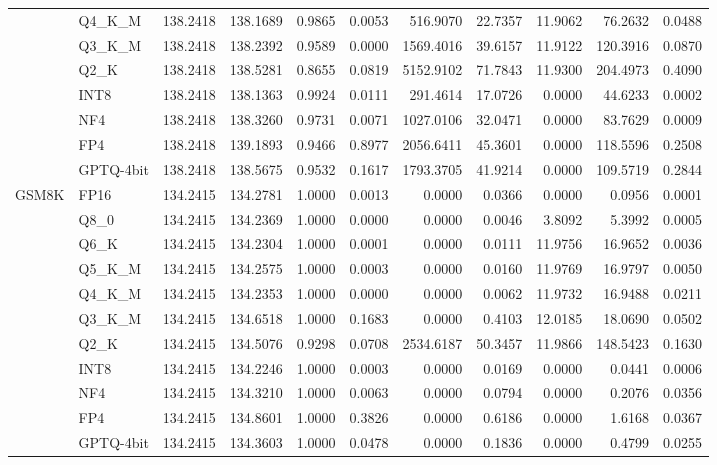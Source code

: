 \begin{table}[t]
{\begin{tabular}{llrrrrrrrrr}
 & Q4\_K\_M & 138.2418 & 138.1689 & 0.9865 & 0.0053 & 516.9070 & 22.7357 & 11.9062 & 76.2632 & 0.0488 \\
 & Q3\_K\_M & 138.2418 & 138.2392 & 0.9589 & 0.0000 & 1569.4016 & 39.6157 & 11.9122 & 120.3916 & 0.0870 \\
 & Q2\_K & 138.2418 & 138.5281 & 0.8655 & 0.0819 & 5152.9102 & 71.7843 & 11.9300 & 204.4973 & 0.4090 \\
 & INT8 & 138.2418 & 138.1363 & 0.9924 & 0.0111 & 291.4614 & 17.0726 & 0.0000 & 44.6233 & 0.0002 \\
 & NF4 & 138.2418 & 138.3260 & 0.9731 & 0.0071 & 1027.0106 & 32.0471 & 0.0000 & 83.7629 & 0.0009 \\
 & FP4 & 138.2418 & 139.1893 & 0.9466 & 0.8977 & 2056.6411 & 45.3601 & 0.0000 & 118.5596 & 0.2508 \\
 & GPTQ-4bit & 138.2418 & 138.5675 & 0.9532 & 0.1617 & 1793.3705 & 41.9214 & 0.0000 & 109.5719 & 0.2844 \\
\midrule
GSM8K & FP16 & 134.2415 & 134.2781 & 1.0000 & 0.0013 & 0.0000 & 0.0366 & 0.0000 & 0.0956 & 0.0001 \\
 & Q8\_0 & 134.2415 & 134.2369 & 1.0000 & 0.0000 & 0.0000 & 0.0046 & 3.8092 & 5.3992 & 0.0005 \\
 & Q6\_K & 134.2415 & 134.2304 & 1.0000 & 0.0001 & 0.0000 & 0.0111 & 11.9756 & 16.9652 & 0.0036 \\
 & Q5\_K\_M & 134.2415 & 134.2575 & 1.0000 & 0.0003 & 0.0000 & 0.0160 & 11.9769 & 16.9797 & 0.0050 \\
 & Q4\_K\_M & 134.2415 & 134.2353 & 1.0000 & 0.0000 & 0.0000 & 0.0062 & 11.9732 & 16.9488 & 0.0211 \\
 & Q3\_K\_M & 134.2415 & 134.6518 & 1.0000 & 0.1683 & 0.0000 & 0.4103 & 12.0185 & 18.0690 & 0.0502 \\
 & Q2\_K & 134.2415 & 134.5076 & 0.9298 & 0.0708 & 2534.6187 & 50.3457 & 11.9866 & 148.5423 & 0.1630 \\
 & INT8 & 134.2415 & 134.2246 & 1.0000 & 0.0003 & 0.0000 & 0.0169 & 0.0000 & 0.0441 & 0.0006 \\
 & NF4 & 134.2415 & 134.3210 & 1.0000 & 0.0063 & 0.0000 & 0.0794 & 0.0000 & 0.2076 & 0.0356 \\
 & FP4 & 134.2415 & 134.8601 & 1.0000 & 0.3826 & 0.0000 & 0.6186 & 0.0000 & 1.6168 & 0.0367 \\
 & GPTQ-4bit & 134.2415 & 134.3603 & 1.0000 & 0.0478 & 0.0000 & 0.1836 & 0.0000 & 0.4799 & 0.0255 \\
\bottomrule
\end{tabular}}
\end{table}